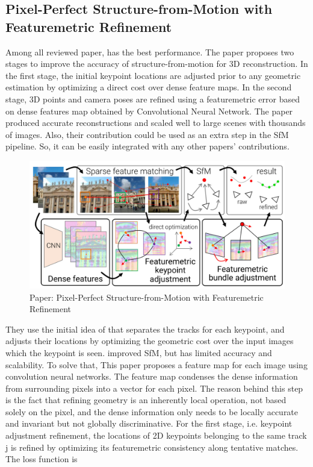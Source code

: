 \documentclass[11pt]{article}
\begin{document}
    \newpage
    \subsection{Pixel-Perfect Structure-from-Motion with Featuremetric Refinement}
    Among all reviewed paper, \cite{lindenberger2021pixsfm} has the best performance. The paper
    proposes two stages to improve the accuracy of structure-from-motion for 3D reconstruction.
    In the first stage, the initial keypoint locations are adjusted prior to any geometric estimation
    by optimizing a direct cost over dense feature maps. In the second stage, 3D points and camera poses
    are refined using a featuremetric error based on dense features map obtained by Convolutional Neural Network.
    The paper produced accurate reconstructions and scaled well to large scenes with thousands of images.
    Also, their contribution could be used as an extra step in the SfM pipeline. So, it can be easily
    integrated with any other papers' contributions.

    \begin{figure}
    \caption{Paper: Pixel-Perfect Structure-from-Motion with Featuremetric Refinement}
    \centering
    \includegraphics[width=\textwidth,height=\textheight,keepaspectratio]{images/pixel_perfect.jpg}
    \end{figure}

    They use the initial idea of \cite{Dusmanu2020Multi} that separates the tracks for each keypoint, and
    adjusts their locations by optimizing the geometric cost over the input images which the keypoint
    is seen. \cite{Dusmanu2020Multi} improved SfM, but has limited accuracy and scalability. To solve that, This paper proposes
    a feature map for each image using convolution neural networks. The feature map condenses the dense
    information from surrounding pixels into a vector for each pixel. The reason behind this step is the
    fact that refining geometry is an inherently local operation, not based solely on the pixel, and the
    dense information only needs to be locally accurate and invariant but not globally discriminative.
    For the first stage, i.e. keypoint adjustment refinement, the locations of 2D keypoints belonging to the same
    track j is refined by optimizing its featuremetric consistency along tentative matches. The loss function is
\end{document}
